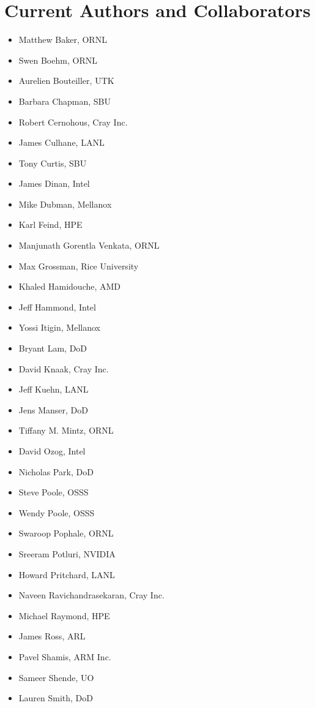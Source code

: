 \section*{Current Authors and Collaborators}
\begin{itemize}
\item Matthew Baker, \ac{ORNL}
\item Swen Boehm, \ac{ORNL}
\item Aurelien Bouteiller, \ac{UTK}
\item Barbara Chapman, \ac{SBU}
\item Robert Cernohous, Cray Inc.
\item James Culhane, \ac{LANL}
\item Tony Curtis, \ac{SBU}
\item James Dinan, Intel
\item Mike Dubman, Mellanox
\item Karl Feind, \ac{HPE}
\item Manjunath Gorentla Venkata, \ac{ORNL}
\item Max Grossman, Rice University
\item Khaled Hamidouche, \ac{AMD}
\item Jeff Hammond, Intel
\item Yossi Itigin, Mellanox
\item Bryant Lam, \ac{DoD}
\item David Knaak, Cray Inc.
\item Jeff Kuehn, \ac{LANL}
\item Jens Manser, \ac{DoD}
\item Tiffany M. Mintz, \ac{ORNL}
\item David Ozog, Intel
\item Nicholas Park, \ac{DoD}
\item Steve Poole, \ac{OSSS}
\item Wendy Poole, \ac{OSSS}
\item Swaroop Pophale, \ac{ORNL}
\item Sreeram Potluri, NVIDIA
\item Howard Pritchard, \ac{LANL}
\item Naveen Ravichandrasekaran, Cray Inc.
\item Michael Raymond, \ac{HPE}
\item James Ross, \ac{ARL}
\item Pavel Shamis, ARM Inc.
\item Sameer Shende, \ac{UO}
\item Lauren Smith, \ac{DoD}

\end{itemize}

